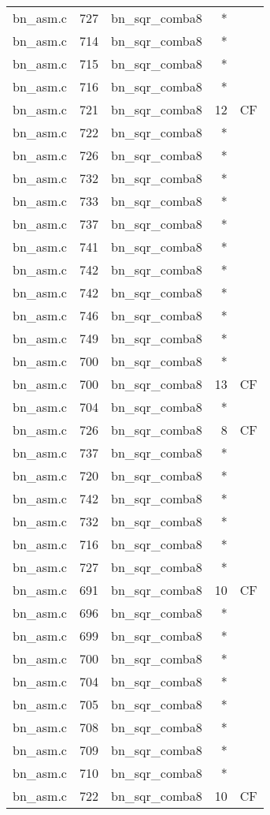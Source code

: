 \begin{table}
\begin{tabular}{clrrr}
bn\_asm.c& 727&bn\_sqr\_comba8&*&\\
bn\_asm.c& 714&bn\_sqr\_comba8&*&\\
bn\_asm.c& 715&bn\_sqr\_comba8&*&\\
bn\_asm.c& 716&bn\_sqr\_comba8&*&\\
bn\_asm.c& 721&bn\_sqr\_comba8&12&CF\\
bn\_asm.c& 722&bn\_sqr\_comba8&*&\\
bn\_asm.c& 726&bn\_sqr\_comba8&*&\\
bn\_asm.c& 732&bn\_sqr\_comba8&*&\\
bn\_asm.c& 733&bn\_sqr\_comba8&*&\\
bn\_asm.c& 737&bn\_sqr\_comba8&*&\\
bn\_asm.c& 741&bn\_sqr\_comba8&*&\\
bn\_asm.c& 742&bn\_sqr\_comba8&*&\\
bn\_asm.c& 742&bn\_sqr\_comba8&*&\\
bn\_asm.c& 746&bn\_sqr\_comba8&*&\\
bn\_asm.c& 749&bn\_sqr\_comba8&*&\\
bn\_asm.c& 700&bn\_sqr\_comba8&*&\\
bn\_asm.c& 700&bn\_sqr\_comba8&13&CF\\
bn\_asm.c& 704&bn\_sqr\_comba8&*&\\
bn\_asm.c& 726&bn\_sqr\_comba8&8 &CF\\
bn\_asm.c& 737&bn\_sqr\_comba8&*&\\
bn\_asm.c& 720&bn\_sqr\_comba8&*&\\
bn\_asm.c& 742&bn\_sqr\_comba8&*&\\
bn\_asm.c& 732&bn\_sqr\_comba8&*&\\
bn\_asm.c& 716&bn\_sqr\_comba8&*&\\
bn\_asm.c& 727&bn\_sqr\_comba8&*&\\
bn\_asm.c& 691&bn\_sqr\_comba8&10&CF\\
bn\_asm.c& 696&bn\_sqr\_comba8&*&\\
bn\_asm.c& 699&bn\_sqr\_comba8&*&\\
bn\_asm.c& 700&bn\_sqr\_comba8&*&\\
bn\_asm.c& 704&bn\_sqr\_comba8&*&\\
bn\_asm.c& 705&bn\_sqr\_comba8&*&\\
bn\_asm.c& 708&bn\_sqr\_comba8&*&\\
bn\_asm.c& 709&bn\_sqr\_comba8&*&\\
bn\_asm.c& 710&bn\_sqr\_comba8&*&\\
bn\_asm.c& 722&bn\_sqr\_comba8&10&CF\\

\end{tabular}
\end{table}
